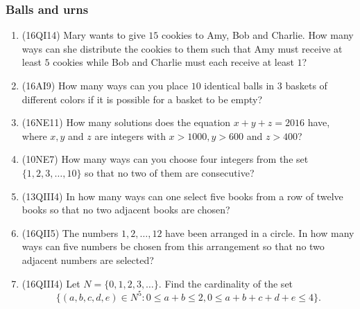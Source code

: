 \documentclass[10pt,paper=letter]{scrartcl}
\begin{document}
\subsubsection*{Balls and urns}

\begin{enumerate}

\item (16QI14) Mary wants to give $15$ cookies to Amy, Bob and Charlie. How many ways can she distribute the cookies to them such that Amy must receive at least $5$ cookies while Bob and Charlie must each receive at least $1$?

\item (16AI9) How many ways can you place $10$ identical balls in $3$ baskets of different colors if it is possible for a basket to be empty?

\item (16NE11) How many solutions does the equation $x+y+z=2016$ have, where $x, y$ and $z$ are integers with $x > 1000, y > 600$ and $z > 400$?

\item (10NE7) How many ways can you choose four integers from the set $\{1, 2, 3, \ldots, 10\}$ so that no two of them are consecutive?

\item (13QIII4) In how many ways can one select five books from a row of twelve books so that no two adjacent books are chosen?

\item (16QII5) The numbers $1, 2, \ldots, 12$ have been arranged in a circle. In how many ways can five numbers be chosen from this arrangement so that no two adjacent numbers are selected?

\item (16QIII4) Let $N = \{0, 1, 2, 3, \ldots\}$. Find the cardinality of the set $$\{(a,b,c,d,e)\in N^5 : 0 \leq a + b \leq 2, 0 \leq a + b + c + d + e \leq 4 \}.$$

\end{enumerate}
\end{document}
